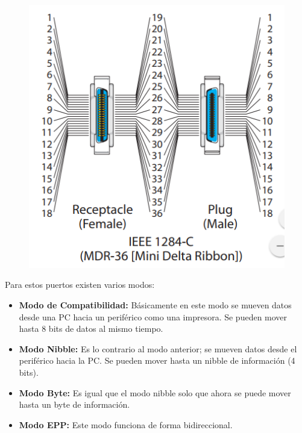 \documentclass[a4paper,12pt]{article}
\begin{document}
\begin{enumerate}
\begin{figure}[H]
   \includegraphics[scale = 0.4]{6.png}
  \end{figure}
  Para estos puertos existen varios modos:
  \begin{itemize}
  \item \textbf{Modo de Compatibilidad:} Básicamente en este modo se mueven datos desde una PC hacia
  un periférico como una impresora. Se pueden mover hasta 8 bits de datos al mismo tiempo.
  \item \textbf{Modo Nibble:} Es lo contrario al modo anterior; se mueven datos desde el periférico hacia la PC.
  Se pueden mover hasta un nibble de información (4 bits).
  \item \textbf{Modo Byte:} Es igual que el modo nibble solo que ahora se puede mover
  hasta un byte de información.
  \item \textbf{Modo EPP:} Este modo funciona de forma bidireccional.
  \end{itemize}


\end{enumerate}
\end{document}
